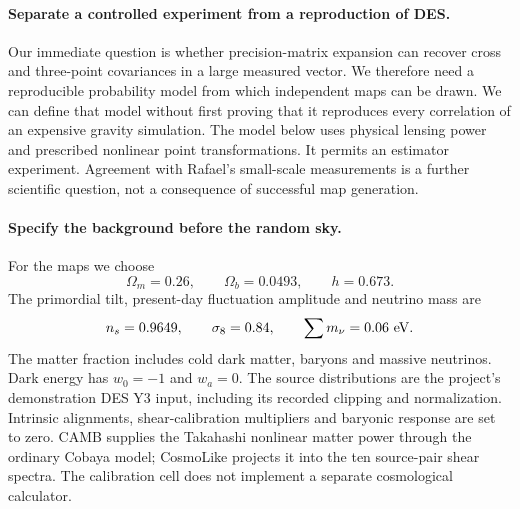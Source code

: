 \documentclass[11pt]{article}
\begin{document}
\paragraph{Separate a controlled experiment from a reproduction of DES.}
Our immediate question is whether precision-matrix expansion can recover
cross and three-point covariances in a large measured vector. We therefore
need a reproducible probability model from which independent maps can be
drawn. We can define that model without first proving that it reproduces
every correlation of an expensive gravity simulation. The model below uses
physical lensing power and prescribed nonlinear point transformations.
It permits an estimator experiment. Agreement with Rafael's small-scale
measurements is a further scientific question, not a consequence of
successful map generation.

\paragraph{Specify the background before the random sky.}
For the maps we choose
\begin{equation}
 \Omega_m=0.26,\qquad \Omega_b=0.0493,\qquad h=0.673.
\end{equation}
The primordial tilt, present-day fluctuation amplitude and neutrino mass are
\begin{equation}
 n_s=0.9649,\qquad \sigma_8=0.84,\qquad \sum m_\nu=0.06\ {\rm eV}.
\end{equation}
The matter fraction includes cold dark matter, baryons and massive
neutrinos. Dark energy has $w_0=-1$ and $w_a=0$. The source distributions
are the project's demonstration DES Y3 input, including its recorded
clipping and normalization. Intrinsic alignments, shear-calibration
multipliers and baryonic response are set to zero. CAMB supplies the
Takahashi nonlinear matter power through the ordinary Cobaya model;
CosmoLike projects it into the ten source-pair shear spectra. The
calibration cell does not implement a separate cosmological calculator.
\end{document}

